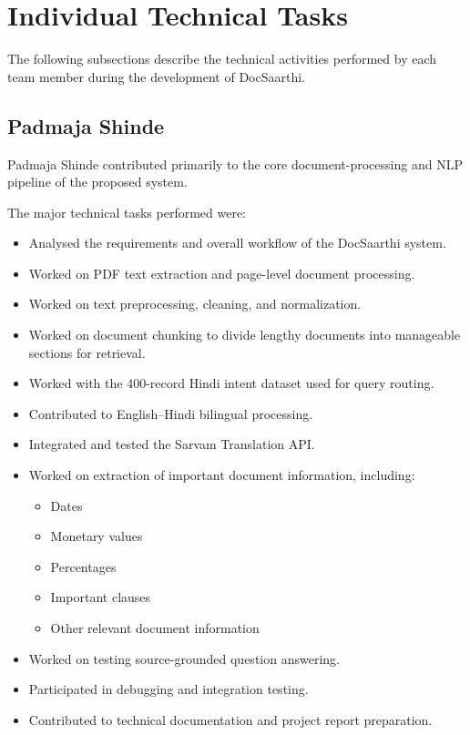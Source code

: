 \section{Individual Technical Tasks}

The following subsections describe the technical activities performed
by each team member during the development of DocSaarthi.

\subsection{Padmaja Shinde}

Padmaja Shinde contributed primarily to the core document-processing
and NLP pipeline of the proposed system.

The major technical tasks performed were:

\begin{itemize}

    \item Analysed the requirements and overall workflow of the
    DocSaarthi system.

    \item Worked on PDF text extraction and page-level document
    processing.

    \item Worked on text preprocessing, cleaning, and normalization.

    \item Worked on document chunking to divide lengthy documents
    into manageable sections for retrieval.

    \item Worked with the 400-record Hindi intent dataset used for
    query routing.

    \item Contributed to English--Hindi bilingual processing.

    \item Integrated and tested the Sarvam Translation API.

    \item Worked on extraction of important document information,
    including:
    \begin{itemize}
        \item Dates
        \item Monetary values
        \item Percentages
        \item Important clauses
        \item Other relevant document information
    \end{itemize}

    \item Worked on testing source-grounded question answering.

    \item Participated in debugging and integration testing.

    \item Contributed to technical documentation and project report
    preparation.

\end{itemize}

